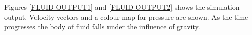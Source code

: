 Figures \ref{FLUID OUTPUT1} and \ref{FLUID OUTPUT2} shows the simulation output. Velocity vectors and a colour map for pressure are shown. As the time progresses the body of fluid falls under the influence of gravity. 
% 
\begin{figure}
\center
{}

\end{figure}
